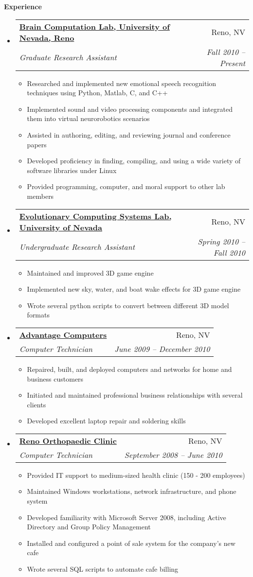 \documentclass[letterpaper,11pt]{article}
\makeatletter
\newcommand{\resitem}[1]{\item #1 \vspace{-2pt}}
\newcommand{\resheading}[1]{{\large \colorbox{mygrey}{\begin{minipage}{\textwidth}{\textbf{#1 \vphantom{p\^{E}}}}\end{minipage}}}}
\newcommand{\ressubheading}[4]{
\begin{tabular*}{6.5in}{l@{\extracolsep{\fill}}r}
		\textbf{#1} & #2 \\
		\textit{#3} & \textit{#4} \\
\end{tabular*}\vspace{-6pt}}
\makeatother
\begin{document}
\resheading{Experience}
	\begin{itemize}
		\item 
			\ressubheading{\href{http://www.cse.unr.edu/brain/}{Brain Computation Lab, University of Nevada, Reno}}{Reno, NV}{Graduate Research Assistant}{Fall 2010 -- Present}
				{ \footnotesize
				\begin{itemize}
					\resitem{Researched and implemented new emotional speech recognition techniques using Python, Matlab, C, and C++}
					\resitem{Implemented sound and video processing components and integrated them into virtual neurorobotics scenarios}
					\resitem{Assisted in authoring, editing, and reviewing journal and conference papers}
					\resitem{Developed proficiency in finding, compiling, and using a wide variety of software libraries under Linux}
					\resitem{Provided programming, computer, and moral support to other lab members}
				\end{itemize}
				}
		\item 
			\ressubheading{\href{http://ecsl.cse.unr.edu/}{Evolutionary Computing Systems Lab, University of Nevada}}{Reno, NV}{Undergraduate Research Assistant}{Spring 2010 -- Fall 2010}
				{ \footnotesize
				\begin{itemize}
					\resitem{Maintained and improved 3D game engine}
					\resitem{Implemented new sky, water, and boat wake effects for 3D game engine}
					\resitem{Wrote several python scripts to convert between different 3D model formats}
				\end{itemize}
				}
		\item
			\ressubheading{\href{http://www.advantage-computers.net/}{Advantage Computers}}{Reno, NV}{Computer Technician}{June 2009 -- December 2010}
				{ \footnotesize
				\begin{itemize}
					\resitem{Repaired, built, and deployed computers and networks for home and business customers}
					\resitem{Initiated and maintained professional business relationships with several clients}
					\resitem{Developed excellent laptop repair and soldering skills}
				\end{itemize}
				}
		\item
			\ressubheading{\href{http://www.renoortho.com/}{Reno Orthopaedic Clinic}}{Reno, NV}{Computer Technician}{September 2008 -- June 2010}
				{ \footnotesize
				\begin{itemize}
					\resitem{Provided IT support to medium-sized health clinic (150 - 200 employees)}
					\resitem{Maintained Windows workstations, network infrastructure, and phone system}
					\resitem{Developed familiarity with Microsoft Server 2008, including Active Directory and Group Policy Management}
					\resitem{Installed and configured a point of sale system for the company's new cafe}
					\resitem{Wrote several SQL scripts to automate cafe billing} 
				\end{itemize}
				}
	\end{itemize}  %
\end{document}
